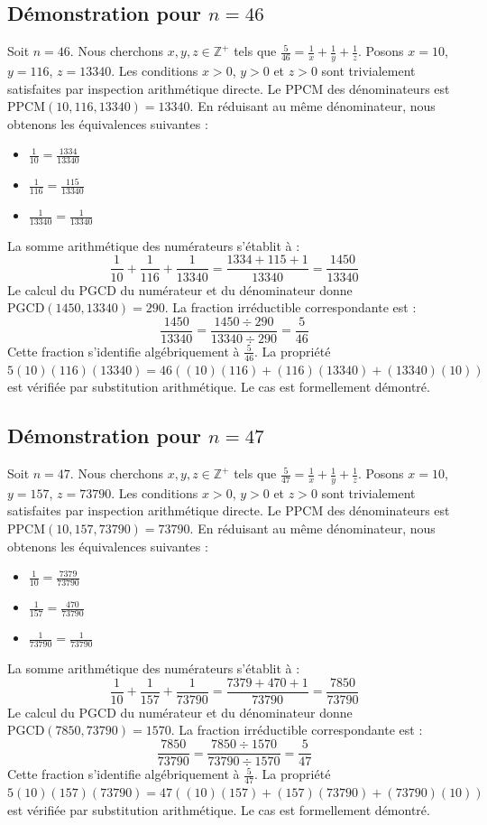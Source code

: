 \documentclass[12pt,a4paper]{article}
\begin{document}
\subsection{Démonstration pour $n = 46$}
Soit $n = 46$. Nous cherchons $x, y, z \in \mathbb{Z}^{+}$ tels que $\frac{5}{46} = \frac{1}{x} + \frac{1}{y} + \frac{1}{z}$.
Posons $x = 10$, $y = 116$, $z = 13340$.
Les conditions $x > 0$, $y > 0$ et $z > 0$ sont trivialement satisfaites par inspection arithmétique directe.
Le PPCM des dénominateurs est $\text{PPCM}(10, 116, 13340) = 13340$.
En réduisant au même dénominateur, nous obtenons les équivalences suivantes :
\begin{itemize}
    \item $\frac{1}{10} = \frac{1334}{13340}$
    \item $\frac{1}{116} = \frac{115}{13340}$
    \item $\frac{1}{13340} = \frac{1}{13340}$
\end{itemize}
La somme arithmétique des numérateurs s'établit à :
$$ \frac{1}{10} + \frac{1}{116} + \frac{1}{13340} = \frac{1334 + 115 + 1}{13340} = \frac{1450}{13340} $$
Le calcul du PGCD du numérateur et du dénominateur donne $\text{PGCD}(1450, 13340) = 290$.
La fraction irréductible correspondante est :
$$ \frac{1450}{13340} = \frac{1450 \div 290}{13340 \div 290} = \frac{5}{46} $$
Cette fraction s'identifie algébriquement à $\frac{5}{46}$.
La propriété $5(10)(116)(13340) = 46((10)(116) + (116)(13340) + (13340)(10))$ est vérifiée par substitution arithmétique.
Le cas est formellement démontré.

\subsection{Démonstration pour $n = 47$}
Soit $n = 47$. Nous cherchons $x, y, z \in \mathbb{Z}^{+}$ tels que $\frac{5}{47} = \frac{1}{x} + \frac{1}{y} + \frac{1}{z}$.
Posons $x = 10$, $y = 157$, $z = 73790$.
Les conditions $x > 0$, $y > 0$ et $z > 0$ sont trivialement satisfaites par inspection arithmétique directe.
Le PPCM des dénominateurs est $\text{PPCM}(10, 157, 73790) = 73790$.
En réduisant au même dénominateur, nous obtenons les équivalences suivantes :
\begin{itemize}
    \item $\frac{1}{10} = \frac{7379}{73790}$
    \item $\frac{1}{157} = \frac{470}{73790}$
    \item $\frac{1}{73790} = \frac{1}{73790}$
\end{itemize}
La somme arithmétique des numérateurs s'établit à :
$$ \frac{1}{10} + \frac{1}{157} + \frac{1}{73790} = \frac{7379 + 470 + 1}{73790} = \frac{7850}{73790} $$
Le calcul du PGCD du numérateur et du dénominateur donne $\text{PGCD}(7850, 73790) = 1570$.
La fraction irréductible correspondante est :
$$ \frac{7850}{73790} = \frac{7850 \div 1570}{73790 \div 1570} = \frac{5}{47} $$
Cette fraction s'identifie algébriquement à $\frac{5}{47}$.
La propriété $5(10)(157)(73790) = 47((10)(157) + (157)(73790) + (73790)(10))$ est vérifiée par substitution arithmétique.
Le cas est formellement démontré.
\end{document}
